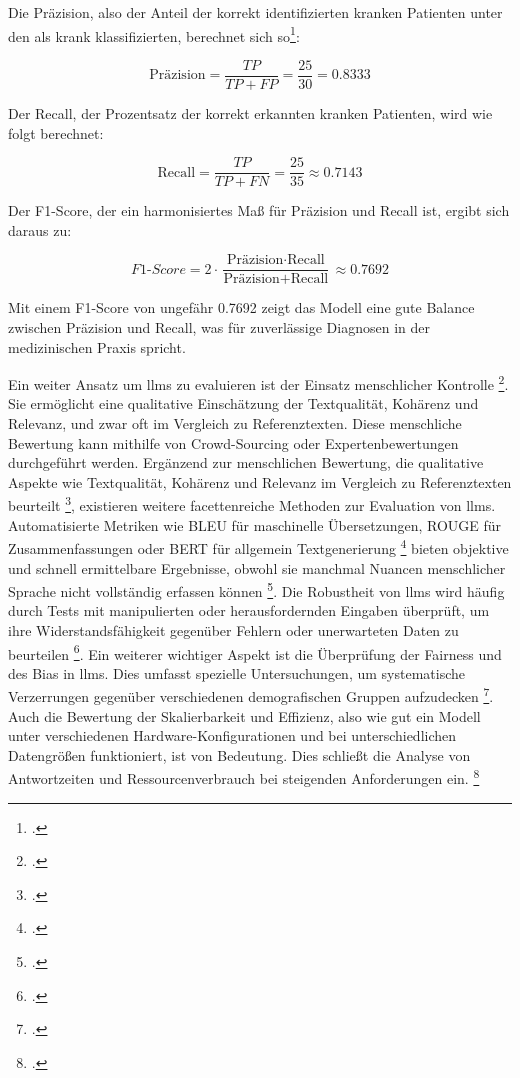 Die Präzision, also der Anteil der korrekt identifizierten kranken Patienten unter den als krank klassifizierten, berechnet sich so\footcite[Vgl.][S. 262 f.]{derczynski-2016-complementarity}:

\begin{equation}
    \text{Präzision} = \frac{TP}{TP + FP} = \frac{25}{30} = 0.8333
\end{equation}

Der Recall, der Prozentsatz der korrekt erkannten kranken Patienten, wird wie folgt berechnet:

\begin{equation}
    \text{Recall} = \frac{TP}{TP + FN} = \frac{25}{35} \approx 0.7143
\end{equation}

Der F1-Score, der ein harmonisiertes Maß für Präzision und Recall ist, ergibt sich daraus zu:

\begin{equation}
    F1\text{-}Score = 2 \cdot \frac{\text{Präzision} \cdot \text{Recall}}{\text{Präzision} + \text{Recall}} \approx 0.7692
\end{equation}

Mit einem F1-Score von ungefähr 0.7692 zeigt das Modell eine gute Balance zwischen Präzision und Recall, was für zuverlässige Diagnosen in der medizinischen Praxis spricht.

Ein weiter Ansatz um \acp{llm} zu evaluieren ist der Einsatz menschlicher Kontrolle \footcite[Vgl.][S. 1]{chiang2023large}.
Sie ermöglicht eine qualitative Einschätzung der Textqualität, Kohärenz und Relevanz, und zwar oft im Vergleich zu Referenztexten.
Diese menschliche Bewertung kann mithilfe von Crowd-Sourcing oder Expertenbewertungen durchgeführt werden.
Ergänzend zur menschlichen Bewertung, die qualitative Aspekte wie Textqualität, Kohärenz und Relevanz im Vergleich zu Referenztexten beurteilt \footcite[Vgl.][S. 73]{liang2023holistic}, existieren weitere facettenreiche Methoden zur Evaluation von \acp{llm}.
Automatisierte Metriken wie BLEU für maschinelle Übersetzungen, ROUGE für Zusammenfassungen oder BERT für allgemein Textgenerierung \footcite[Vgl.][S. 1]{zhang2020bertscore} bieten objektive und schnell ermittelbare Ergebnisse, obwohl sie manchmal Nuancen menschlicher Sprache nicht vollständig erfassen können \footcite[Vgl.][S. 27 f.]{chang2023survey}. Die Robustheit von \acp{llm} wird häufig durch Tests mit manipulierten oder herausfordernden Eingaben überprüft, um ihre Widerstandsfähigkeit gegenüber Fehlern oder unerwarteten Daten zu beurteilen \footcite[Vgl.][S. 29 f.]{liang2023holistic}.
Ein weiterer wichtiger Aspekt ist die Überprüfung der Fairness und des Bias in \acp{llm}.
Dies umfasst spezielle Untersuchungen, um systematische Verzerrungen gegenüber verschiedenen demografischen Gruppen aufzudecken \footcite[Vgl.][S. 30 f.]{liang2023holistic}.
Auch die Bewertung der Skalierbarkeit und Effizienz, also wie gut ein Modell unter verschiedenen Hardware-Konfigurationen und bei unterschiedlichen Datengrößen funktioniert, ist von Bedeutung.
Dies schließt die Analyse von Antwortzeiten und Ressourcenverbrauch bei steigenden Anforderungen ein. \footcite[Vgl.][S. 33]{liang2023holistic}

